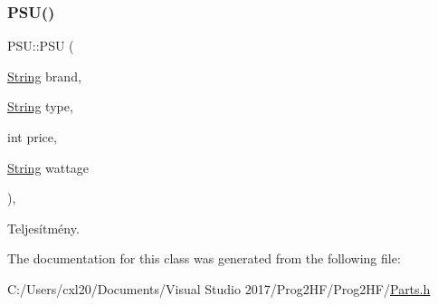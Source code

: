 \subsubsection{\texorpdfstring{PSU()}{PSU()}}
{\footnotesize\ttfamily P\+S\+U\+::\+P\+SU (\begin{DoxyParamCaption}\item[{\mbox{\hyperlink{class_string}{String}}}]{brand,  }\item[{\mbox{\hyperlink{class_string}{String}}}]{type,  }\item[{int}]{price,  }\item[{\mbox{\hyperlink{class_string}{String}}}]{wattage }\end{DoxyParamCaption})\hspace{0.3cm}{\ttfamily [inline]}, {\ttfamily [explicit]}}



Teljesítmény. 



The documentation for this class was generated from the following file\+:\begin{DoxyCompactItemize}
\item 
C\+:/\+Users/cxl20/\+Documents/\+Visual Studio 2017/\+Prog2\+H\+F/\+Prog2\+H\+F/\mbox{\hyperlink{_parts_8h}{Parts.\+h}}\end{DoxyCompactItemize}

